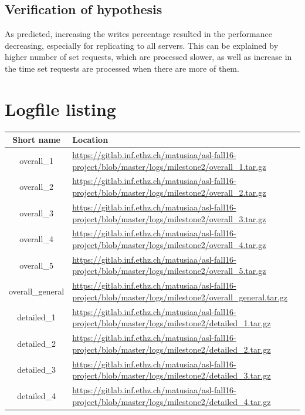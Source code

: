 \documentclass[11pt]{article}
\begin{document}
\subsection{Verification of hypothesis}
As predicted, increasing the writes percentage resulted in the performance decreasing, especially for replicating to all servers. This can be explained by higher number of set requests, which are processed slower, as well as increase in the time set requests are processed when there are more of them. 


\clearpage

\section*{Logfile listing}

\begin{tabular}{|c|p{12.0cm}|}
\hline \textbf{Short name }& \textbf{Location} \\ 
\hline  overall\_1 & \url{https://gitlab.inf.ethz.ch/matusiaa/asl-fall16-project/blob/master/logs/milestone2/overall_1.tar.gz}\\ 
\hline overall\_2 & \url{https://gitlab.inf.ethz.ch/matusiaa/asl-fall16-project/blob/master/logs/milestone2/overall_2.tar.gz}\\ 
\hline overall\_3 & \url{https://gitlab.inf.ethz.ch/matusiaa/asl-fall16-project/blob/master/logs/milestone2/overall_3.tar.gz}\\ 
\hline overall\_4 & \url{https://gitlab.inf.ethz.ch/matusiaa/asl-fall16-project/blob/master/logs/milestone2/overall_4.tar.gz}\\ 
\hline overall\_5 & \url{https://gitlab.inf.ethz.ch/matusiaa/asl-fall16-project/blob/master/logs/milestone2/overall_5.tar.gz}\\ 
\hline overall\_general & \url{https://gitlab.inf.ethz.ch/matusiaa/asl-fall16-project/blob/master/logs/milestone2/overall_general.tar.gz}\\ 
\hline  detailed\_1 & \url{https://gitlab.inf.ethz.ch/matusiaa/asl-fall16-project/blob/master/logs/milestone2/detailed_1.tar.gz}\\
\hline  detailed\_2 & \url{https://gitlab.inf.ethz.ch/matusiaa/asl-fall16-project/blob/master/logs/milestone2/detailed_2.tar.gz}\\ 
\hline  detailed\_3 & \url{https://gitlab.inf.ethz.ch/matusiaa/asl-fall16-project/blob/master/logs/milestone2/detailed_3.tar.gz}\\ 
\hline  detailed\_4 & \url{https://gitlab.inf.ethz.ch/matusiaa/asl-fall16-project/blob/master/logs/milestone2/detailed_4.tar.gz}\\ 

\end{tabular}
\end{document}
